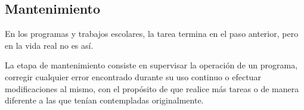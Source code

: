 \subsection{Mantenimiento}
En los programas y trabajos escolares, la tarea termina en el paso anterior, pero en la vida real no es así. 
\par
La etapa de mantenimiento consiste en supervisar la operación de un programa, corregir cualquier error encontrado durante su uso continuo o efectuar modificaciones al mismo, con el propósito de que realice más tareas o de manera diferente a las que tenían contempladas originalmente.
